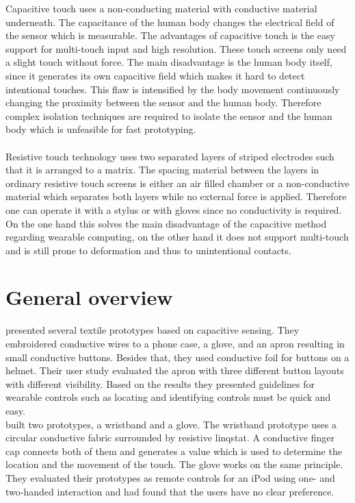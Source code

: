 Capacitive touch uses a non-conducting material with conductive material underneath. The capacitance of the human body changes the electrical field of the sensor which is measurable. The advantages of capacitive touch is the easy support for multi-touch input and high resolution. These touch screens only need a slight touch without force. The main disadvantage is the human body itself, since  it generates its own capacitive field which makes it hard to detect intentional touches. This flaw is intensified by the body movement continuously changing the proximity between the sensor and the human body. Therefore complex isolation techniques are required to isolate the sensor and the human body which is unfeasible for fast prototyping. \\ \\
Resistive touch technology uses two separated layers of striped electrodes such that it is arranged to a matrix. The spacing material between the layers in ordinary resistive touch screens is either an air filled chamber or a non-conductive material which separates both layers while no external force is applied. Therefore one can operate it with a stylus or with gloves since no conductivity is required. On the one hand this solves the main disadvantage of the capacitive method regarding wearable computing, on the other hand it does not support multi-touch and is still prone to deformation and thus to unintentional contacts.

\section{General overview}
\cite{Holleis:2008:ECT:1409240.1409250} presented several textile prototypes based on capacitive sensing. They embroidered conductive wires to  a phone case, a glove, and an apron resulting in small conductive buttons. Besides that, they used conductive foil for buttons on a helmet. Their user study evaluated the apron with three different button layouts with different visibility. Based on the results they presented guidelines for wearable controls such as locating and identifying controls must be quick and easy.
\\
\cite{Speir:2014:WRC:2628363.2634221} built two prototypes, a wristband and a glove. The wristband prototype uses a circular conductive fabric surrounded by resistive linqstat. A conductive finger cap connects both of them and generates a value which is used to determine the location and the movement of the touch. The glove works on the same principle. They evaluated their prototypes as remote controls for an iPod using one- and two-handed interaction and had found that the users have no clear preference. 

